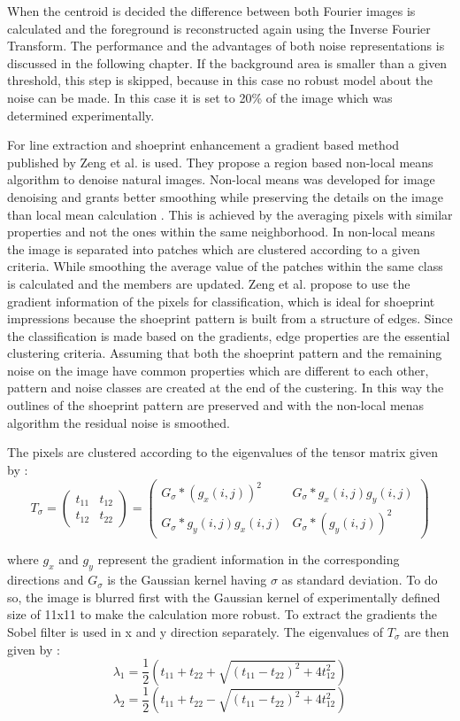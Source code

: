 \documentclass[draft,final]{vutinfth} %
\begin{document}
When the centroid is decided the difference between both Fourier images is calculated and the foreground is reconstructed again using the Inverse Fourier Transform.
The performance and the advantages of both noise representations is discussed in the following chapter.
If the background area is smaller than a given threshold, this step is skipped, because in this case no robust model about the noise can be made.
In this case it is set to 20\% of the image which was determined experimentally.
\par
For line extraction and shoeprint enhancement a gradient based method published by Zeng et al. \cite{zeng2011region} is used.
They propose a region based non-local means algorithm to denoise natural images.
Non-local means was developed for image denoising and grants better smoothing while preserving the details on the image than local mean calculation \cite{buades2005non}.
This is achieved by the averaging pixels with similar properties and not the ones within the same neighborhood.
In non-local means the image is separated into patches which are clustered according to a given criteria.
While smoothing the average value of the patches within the same class is calculated and the members are updated.
Zeng et al. \cite{zeng2011region} propose to use the gradient information of the pixels for classification, which is ideal for shoeprint impressions because the shoeprint pattern is built from a structure of edges.
Since the classification is made based on the gradients, edge properties are the essential clustering criteria.
Assuming that both the shoeprint pattern and the remaining noise on the image have common properties which are different to each other, pattern and noise classes are created at the end of the custering.
In this way the outlines of the shoeprint pattern are preserved and with the non-local menas algorithm the residual noise is smoothed.
\par 
The pixels are clustered according to the eigenvalues of the tensor matrix given by \cite{zeng2011region}:
\[T_\sigma = 
\begin{pmatrix}
t_{11} & t_{12} \\
t_{12} & t_{22}
\end{pmatrix}
=
\begin{pmatrix}
G_\sigma*(g_x(i,j))^2 & G_{\sigma}*g_x(i, j)g_y(i, j)\\
G_{\sigma}*g_y(i, j)g_x(i, j) & G_{\sigma}*(g_y(i, j))^2
\end{pmatrix}
\]

where $g_x$ and $g_y$ represent the gradient information in the corresponding directions and $G_\sigma$ is the Gaussian kernel having $\sigma$ as standard deviation.
To do so, the image is blurred first with the Gaussian kernel of experimentally defined size of 11x11 to make the calculation more robust.
To extract the gradients the Sobel filter is used in x and y direction separately.
The eigenvalues of $T_\sigma$ are then given by \cite{zeng2011region}:
\[\lambda_1 = \frac{1}{2}(t_{11} + t_{22} + \sqrt{(t_{11}-t_{22})^2 + 4t_{12}^2})\]  
\[\lambda_2 = \frac{1}{2}(t_{11} + t_{22} - \sqrt{(t_{11}-t_{22})^2 + 4t_{12}^2})\]  
\label{eig}
\end{document}
